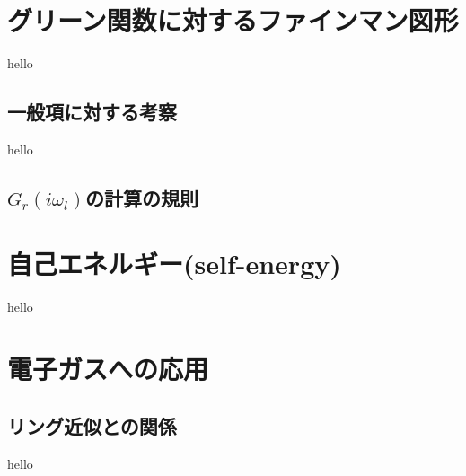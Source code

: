 \documentclass[dvipdfmx,11pt]{beamer}
\begin{document}
\section{グリーン関数に対するファインマン図形}
\begin{frame}
    hello
\end{frame}

\subsection{一般項に対する考察}
\begin{frame}
    hello
\end{frame}
\subsection{$G_r(i\omega_l)$の計算の規則}

\section{自己エネルギー(self-energy)}
\begin{frame}
    hello
\end{frame}

\section{電子ガスへの応用}
\subsection{リング近似との関係}
\begin{frame}
    hello
\end{frame}
\end{document}
